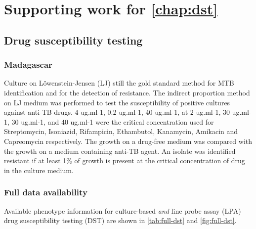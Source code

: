 \chapter{Supporting work for \autoref*{chap:dst}}

\section{Drug susceptibility testing}
\label{app:dst-ext-methods}
\subsection{Madagascar}
Culture on Löwenstein-Jensen (LJ) still the gold standard method for MTB identification and for the detection of resistance. The indirect proportion method on LJ medium was performed to test the susceptibility of positive cultures against anti-TB drugs. 4 ug.ml-1, 0.2 ug.ml-1, 40 ug.ml-1, at 2 ug.ml-1, 30 ug.ml-1, 30 ug.ml-1, and 40 ug.ml-1 were the critical concentration used for Streptomycin, Isoniazid, Rifampicin, Ethambutol, Kanamycin, Amikacin and Capreomycin respectively. The growth on a drug-free medium was compared with the growth on a medium containing anti-TB agent. An isolate was identified resistant if at least 1\% of growth is present at the critical concentration of drug in the culture medium.  

\subsection{Full data availability}
\label{app:full-dst}

Available phenotype information for culture-based \emph{and} line probe assay (LPA) drug susceptibility testing (DST) are shown in \autoref{tab:full-dst} and \autoref{fig:full-dst}.

